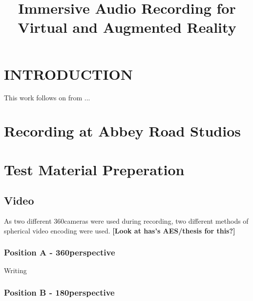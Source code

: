 \documentclass{aes2e}
\begin{document}
\title{Immersive Audio Recording for Virtual and Augmented Reality}


\abstract{}

\maketitle

\section{INTRODUCTION}
	This work follows on from \cite{riaz2017multichannel}...

\section{Recording at Abbey Road Studios}

\section{Test Material Preperation} %
	\subsection{Video}
		As two different 360\textdegree cameras were used during recording, two different methods of spherical video encoding were used. \textbf{[Look at has's AES/thesis for this?]}

			\subsubsection{Position A - 360\textdegree perspective}
				Writing

			\subsubsection{Position B - 180\textdegree perspective}
\end{document}
